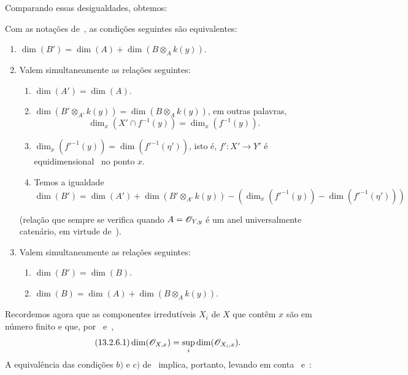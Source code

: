 
Comparando essas desigualdades, obtemos:

\begin{lemma}[13.2.5]
\label{IV.13.2.5}
Com as notações de~, as condições seguintes são equivalentes:
\begin{enumerate}[label=\emph{\alph*)}]
  \item $\dim(B')=\dim(A)+\dim(B\otimes_A k(y))$.
  \item Valem simultaneamente as relações seguintes:
  \begin{enumerate}[label=(\roman*)]
    \item $\dim(A')=\dim(A)$.
    \item $\dim(B'\otimes_{A'}k(y))=\dim(B\otimes_A k(y))$, em outras palavras,
    \[
      \dim_x(X'\cap f^{-1}(y))=\dim_x(f^{-1}(y)).
    \]
    \item $\dim_x(f'^{-1}(y))=\dim(f'^{-1}(\eta'))$,
    isto é, $f':X'\to Y'$ é equidimensional~ no ponto $x$.
    \item Temos a igualdade
    \[
      \dim(B')=\dim(A')+\dim(B'\otimes_{A'}k(y))-(\dim_x(f'^{-1}(y))-\dim(f'^{-1}(\eta')))
    \]
  \end{enumerate}
  (relação que sempre se verifica quando $A=\mathscr{O}_{Y,y}$ é um anel
  universalmente catenário, em virtude de~).
  \item Valem simultaneamente as relações seguintes:
  \begin{enumerate}[label=(\roman*)]
    \item $\dim(B')=\dim(B)$.
    \item $\dim(B)=\dim(A)+\dim(B\otimes_A k(y))$.
  \end{enumerate}
\end{enumerate}
\end{lemma}

\begin{env}[13.2.6]
\label{IV.13.2.6}
Recordemos agora que as componentes irredutíveis $X_i$ de $X$ que contêm $x$
são em número finito e que, por~ e~,
\[
\label{IV.13.2.6.1}
\tag{13.2.6.1}
  \dim(\sh{O}_{X,x})=\sup_i\dim(\sh{O}_{X_i,x}).
\]
A equivalência das condições $b)$ e $c)$ de~ implica,
portanto, levando em conta~ e~:
\end{env}


